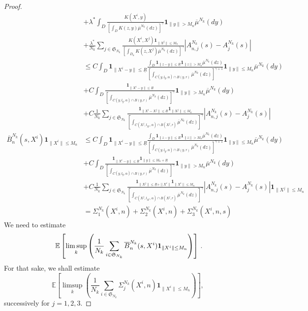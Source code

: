 \documentclass[notitlepage,reqno,11pt]{amsart}
\numberwithin{equation}{section}
\def\E{\mathbb{E}}
\begin{document}
\begin{proof}
\begin{align}
&+ \lambda^* \displaystyle \int_D \frac{K(X^{i},y)}{\left[\displaystyle \int_D K(z,y)\overline{\mu}^{N_k}(dz)\right]^{\gamma}}\mathbf{1}_{\|y\|>M_n}\overline{\mu}^{N_k}(dy)\nonumber\\
&+\frac{\lambda^*}{N_k}\sum_{j\in\mathfrak{S}_{N_k}} \frac{K(X^{i},X^{j}) \mathbf{1}_{\|X^j\|\leq M_n}}{\left[\displaystyle \int_{D_n} K(z,X^j)\overline{\mu}^{N_k}(dz)\right]^{\gamma}}\left| A_{n,j}^{N_k}(s)-A_{j}^{N_k}(s)\right|\nonumber\\
&\leq C \displaystyle \int_D \mathbf{1}_{\|X^i-y\|\leq \underline{R}}\frac{\displaystyle \int_D \mathbf{1}_{\|z-y\|\leq \underline{R}}\mathbf{1}_{\|z\|> M_n}\overline{\mu}^{N_k}(dz)}{\left[\displaystyle \int_{C(y,l_y,\alpha)\cap B(y,r)} \overline{\mu}^{N_k}(dz)\right]^{\gamma+1}}\mathbf{1}_{\|y\|\leq M_n}\overline{\mu}^{N_k}(dy)\nonumber\\
&+C \displaystyle \int_D \frac{\mathbf{1}_{\|X^i-y\|\leq \underline{R}}}{\left[\displaystyle \int_{C(y,l_y,\alpha)\cap B(y,r)} \overline{\mu}^{N_k}(dz)\right]^{\gamma}}\mathbf{1}_{\|y\|>M_n}\overline{\mu}^{N_k}(dy)\nonumber\\
&+ C\frac{1}{N_k}\sum_{j\in\mathfrak{S}_{N_k}} \frac{\mathbf{1}_{\|X^i-X^j\|\leq \underline{R} }\mathbf{1}_{\|X^j\|\leq M_n}}{\left[\displaystyle \int_{C(X^j,l_{X^j},\alpha)\cap B(X^j,r)} \overline{\mu}^{N_k}(dz)\right]^{\gamma}}\left| A_{n,j}^{N_k}(s)-A_{j}^{N_k}(s)\right|\nonumber\\
\overline{B}_n^{N_k}(s,X^i )\mathbf{1}_{\|X^i\|\leq M_n}&\leq C \displaystyle \int_D \mathbf{1}_{\|X^i-y\|\leq \underline{R}}\frac{\displaystyle \int_D \mathbf{1}_{\|z-y\|\leq \underline{R}}\mathbf{1}_{\|z\|> M_n}\overline{\mu}^{N_k}(dz)}{\left[\displaystyle \int_{C(y,l_y,\alpha)\cap B(y,r)} \overline{\mu}^{N_k}(dz)\right]^{\gamma+1}}\mathbf{1}_{\|y\|\leq M_n}\overline{\mu}^{N_k}(dy) \nonumber\\
&+C \displaystyle \int_D \frac{\mathbf{1}_{\|X^i-y\|\leq \underline{R}}\mathbf{1}_{\|y\|\leq M_n +\underline{R}}}{\left[\displaystyle \int_{C(y,l_y,\alpha)\cap B(y,r)} \overline{\mu}^{N_k}(dz)\right]^{\gamma}}\mathbf{1}_{\|y\|>M_n}\overline{\mu}^{N_k}(dy)\nonumber\\
&+ C\frac{1}{N_k}\sum_{j\in\mathfrak{S}_{N_k}} \frac{\mathbf{1}_{\|X^j\|\leq \underline{R}+\|X^i\|} \mathbf{1}_{\|X^i\|\leq M_n}}{\left[\displaystyle \int_{C(X^j,l_{X^j},\alpha)\cap B(X^j,r)} \overline{\mu}^{N_k}(dz)\right]^{\gamma}}\left| A_{n,j}^{N_k}(s)-A_{j}^{N_k}(s)\right|\mathbf{1}_{\|X^j\|\leq M_n}\nonumber\\
&=\displaystyle \Sigma_1^{N_k}(X^i,n)+\Sigma_2^{N_k}(X^i,n)+\Sigma_3^{N_k}(X^i,n,s)\nonumber
\end{align}
\bigskip
We need to estimate 
\[ \E\left[\limsup_k\left(\frac{1}{N_k}\sum_{i\in\mathfrak{S}_{N_k}}\overline{B}^{N_k}_n(s,X^i){\bf1}_{\|X^i\|\le M_n}\right)\right]\,.\]
For that sake, we shall estimate
\[\E\left[\limsup_k\left(\frac{1}{N_k}\sum_{i\in\mathfrak{S}_{N_k}}\Sigma_j^{N_k}(X^i,n)\mathbf{1}_{\|X^i\|\leq M_n}\right)\right],\]
successively for $j=1, 2, 3$.


\end{proof}
\end{document}
